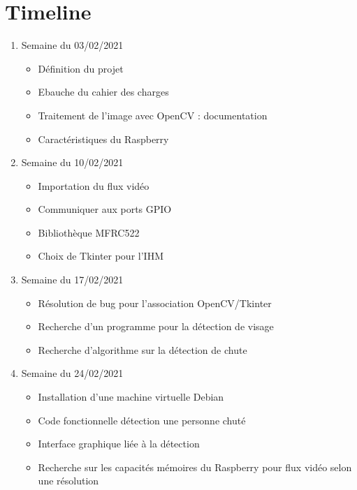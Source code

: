 \documentclass[a4paper]{report}
\begin{document}
        \section{Timeline}
    
    \begin{enumerate}
        \item Semaine du 03/02/2021
            \begin{itemize}
                \item Définition du projet
                \item Ebauche du cahier des charges
                \item Traitement de l'image avec OpenCV : documentation
                \item Caractéristiques du Raspberry
            \end{itemize}
        \item Semaine du 10/02/2021
            \begin{itemize}
                \item Importation du flux vidéo
                \item Communiquer aux ports GPIO 
                \item Bibliothèque MFRC522 
                \item Choix de Tkinter pour l'IHM
            \end{itemize}
        \item Semaine du 17/02/2021
            \begin{itemize}
                \item Résolution de bug pour l'association OpenCV/Tkinter 
                \item Recherche d'un programme pour la détection de visage
                \item Recherche d'algorithme sur la détection de chute
            \end{itemize}
        \item Semaine du 24/02/2021
            \begin{itemize}
                \item Installation d'une machine virtuelle Debian
                \item Code fonctionnelle détection une personne chuté 
                \item Interface graphique liée à la détection
                \item Recherche sur les capacités mémoires du Raspberry pour flux vidéo selon une résolution

\end{itemize}
\end{enumerate}
\end{document}
